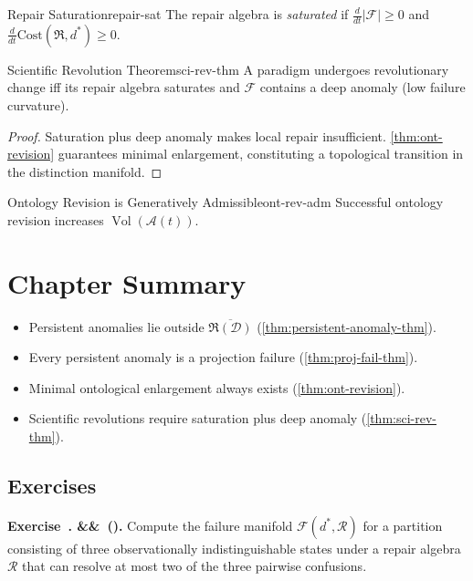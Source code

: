 \documentclass[12pt,twoside,openright]{book}
\newcommand{\adm}{\mathcal{A}}
\newcommand{\repair}{\mathfrak{R}}
\newcommand{\Vol}{\operatorname{Vol}}
\newenvironment{chapsummary}{%
  \begin{tcolorbox}[colback=DistBlue!5,colframe=DistBlue,
    title={\faBookOpen\enspace Summary},
    fonttitle=\sffamily\bfseries\color{white},
    attach boxed title to top left={yshift=-2mm,xshift=4mm},
    boxed title style={colback=DistBlue,rounded corners}]
  \begin{itemize}[nosep,leftmargin=*]}{%
  \end{itemize}\end{tcolorbox}}
\newcounter{exercise}[chapter]
\newenvironment{exercise}[1][]{%
  \refstepcounter{exercise}%
  \noindent\textbf{\sffamily\color{DistBlue}%
  Exercise~\thechapter.\theexercise%
  \ifx&#1&\else~(#1)\fi.}\enspace}{\par\medskip}
\begin{document}
\begin{definition}{Repair Saturation}{repair-sat}
  The repair algebra is \emph{saturated} if
  $\frac{d}{dt}|\mathcal{F}|\ge0$ and
  $\frac{d}{dt}\mathrm{Cost}(\repair,d^*)\ge0$.
\end{definition}

\begin{theorem}{Scientific Revolution Theorem}{sci-rev-thm}
  A paradigm undergoes revolutionary change iff its repair
  algebra saturates and $\mathcal{F}$ contains a deep
  anomaly (low failure curvature).
  \parencite{kuhn1962structure,lakatos1978}
\end{theorem}
\begin{proof}
  Saturation plus deep anomaly makes local repair
  insufficient. \cref{thm:ont-revision} guarantees
  minimal enlargement, constituting a topological
  transition in the distinction manifold.
\end{proof}

\begin{corollary}{Ontology Revision is Generatively
  Admissible}{ont-rev-adm}
  Successful ontology revision increases
  $\Vol(\adm(t))$.
\end{corollary}

\section*{Chapter Summary}
\begin{chapsummary}
  \item Persistent anomalies lie outside
        $\overline{\repair(\mathcal{D})}$
        (\cref{thm:persistent-anomaly-thm}).
  \item Every persistent anomaly is a projection failure
        (\cref{thm:proj-fail-thm}).
  \item Minimal ontological enlargement always exists
        (\cref{thm:ont-revision}).
  \item Scientific revolutions require saturation plus deep
        anomaly (\cref{thm:sci-rev-thm}).
\end{chapsummary}

\subsection*{Exercises}

\begin{exercise}
  Compute the failure manifold $\mathcal{F}(d^*,\mathcal{R})$
  for a partition consisting of three observationally
  indistinguishable states under a repair algebra
  $\mathcal{R}$ that can resolve at most two of the three
  pairwise confusions.
\end{exercise}
\end{document}
